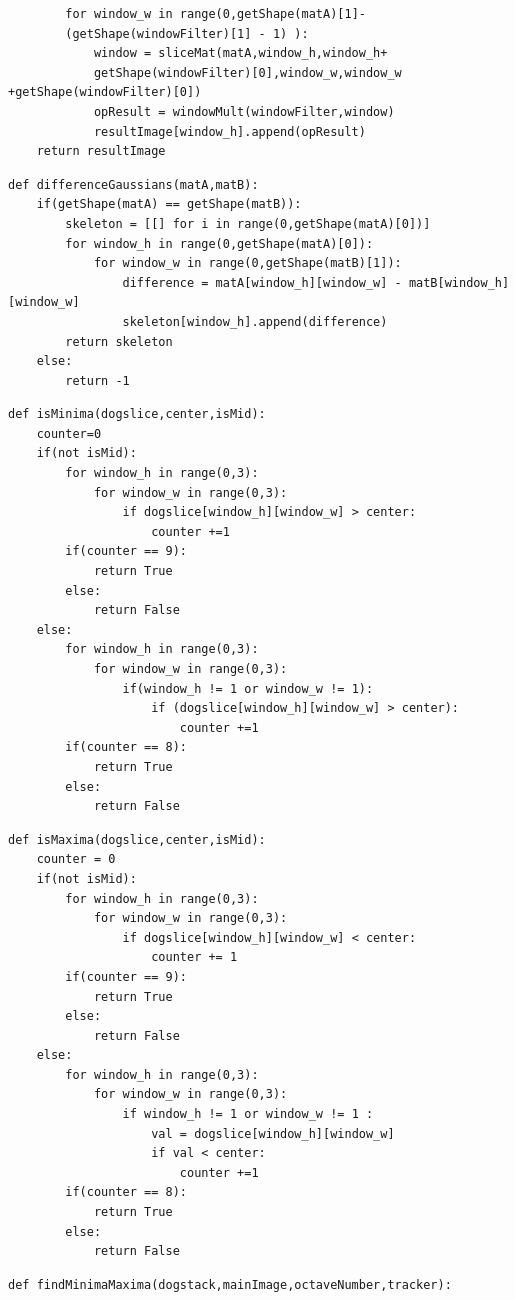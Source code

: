 \documentclass[12pt]{article}
\newenvironment{QandA}
{
	\begin{enumerate}[label=\normalfont\arabic*.,leftmargin=2em,rightmargin=2em]\normalfont
	}
	{
	\end{enumerate}
}
\newenvironment{codelalala}{}{}
\newenvironment{answered}{\setlength{\parindent}{1em}\par\normalfont}{}
\begin{document}
\begin{QandA}
\begin{answered}
\begin{codelalala}
\begin{verbatim}
        for window_w in range(0,getShape(matA)[1]-
        (getShape(windowFilter)[1] - 1) ):
            window = sliceMat(matA,window_h,window_h+
            getShape(windowFilter)[0],window_w,window_w +getShape(windowFilter)[0])
            opResult = windowMult(windowFilter,window)
            resultImage[window_h].append(opResult)
    return resultImage
\end{verbatim}
\begin{verbatim}
def differenceGaussians(matA,matB):
    if(getShape(matA) == getShape(matB)):
        skeleton = [[] for i in range(0,getShape(matA)[0])]
        for window_h in range(0,getShape(matA)[0]):
            for window_w in range(0,getShape(matB)[1]):
                difference = matA[window_h][window_w] - matB[window_h][window_w] 
                skeleton[window_h].append(difference)
        return skeleton
    else:
        return -1
\end{verbatim}
\begin{verbatim}
def isMinima(dogslice,center,isMid):
    counter=0
    if(not isMid):
        for window_h in range(0,3):
            for window_w in range(0,3):
                if dogslice[window_h][window_w] > center:
                    counter +=1
        if(counter == 9):
            return True
        else:
            return False
    else:
        for window_h in range(0,3):
            for window_w in range(0,3):
                if(window_h != 1 or window_w != 1):
                    if (dogslice[window_h][window_w] > center):
                        counter +=1
        if(counter == 8):
            return True
        else:
            return False
\end{verbatim}
\begin{verbatim}
def isMaxima(dogslice,center,isMid):
    counter = 0
    if(not isMid):
        for window_h in range(0,3):
            for window_w in range(0,3):
                if dogslice[window_h][window_w] < center:
                    counter += 1
        if(counter == 9):
            return True
        else:
            return False
    else:
        for window_h in range(0,3):
            for window_w in range(0,3):
                if window_h != 1 or window_w != 1 :
                    val = dogslice[window_h][window_w]
                    if val < center:
                        counter +=1
        if(counter == 8):
            return True
        else:
            return False
\end{verbatim}
\begin{verbatim}
def findMinimaMaxima(dogstack,mainImage,octaveNumber,tracker):

\end{verbatim}
\end{codelalala}
\end{answered}
\end{QandA}
\end{document}
